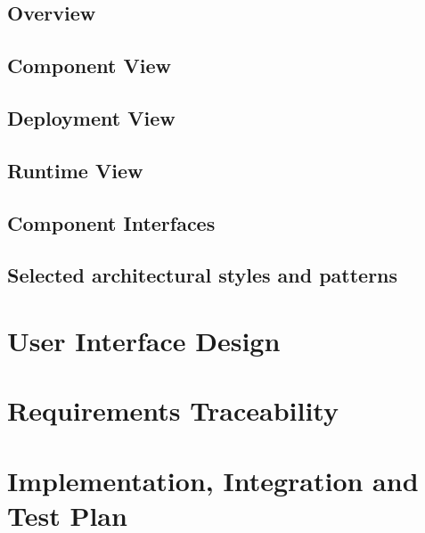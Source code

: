 \documentclass[12pt, a4paper]{report}
\begin{document}
\section{Overview}


\section{Component View}


\section{Deployment View}


\section{Runtime View}


\section{Component Interfaces}


\section{Selected architectural styles and patterns}



\chapter{User Interface Design}
\label{ch:user_interface_design}




\chapter{Requirements Traceability}
\label{ch:requirement_traceability}



\chapter{Implementation, Integration and Test Plan}
\label{ch:implementaion_intergrationandtestplan}
\end{document}
